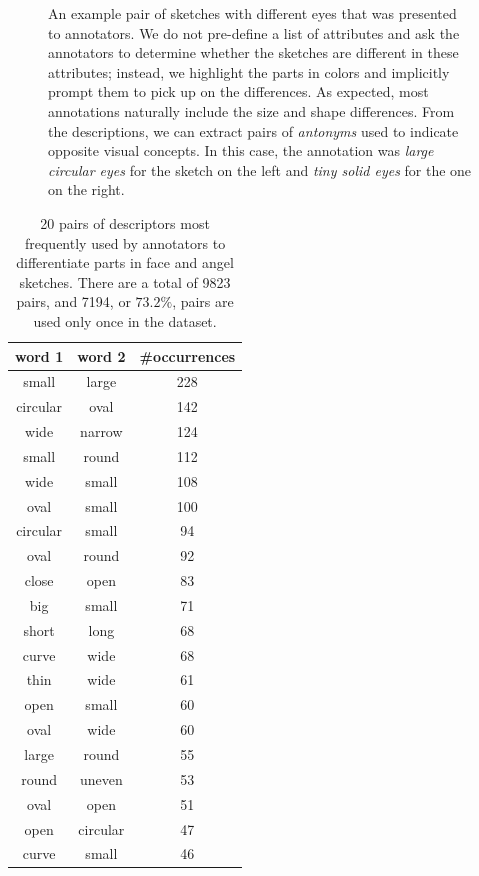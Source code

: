 \begin{figure}[!h]
\begin{subfigure}{0.5\textwidth}
\end{subfigure}
\caption{An example pair of sketches with different eyes that was presented to annotators. We do not pre-define a list of attributes and ask the annotators to determine whether the sketches are different in these attributes; instead, we highlight the parts in colors and implicitly prompt them to pick up on the differences. As expected, most annotations naturally include the size and shape differences. From the descriptions, we can extract pairs of \textit{antonyms} used to indicate opposite visual concepts. In this case, the annotation was \textit{large circular eyes} for the sketch on the left and \textit{tiny solid eyes} for the one on the right.}
\label{results.contrasting.sketches}
\end{figure}

\begin{table}[htb!]
\begin{minipage}{1\textwidth}
\begin{center}
{\small
\begin{tabular}{ccc}
\toprule
word 1 & word 2 & \#occurrences \\
\midrule 
small & large & 228 \\
circular & oval & 142 \\
wide & narrow & 124 \\
small & round & 112 \\
wide & small & 108 \\
oval & small & 100 \\
circular & small & 94 \\
oval & round & 92 \\
close & open & 83 \\
big & small & 71 \\
short & long & 68 \\
curve & wide & 68 \\
thin & wide & 61 \\
open & small & 60 \\
oval & wide & 60 \\
large & round & 55 \\
round & uneven & 53 \\
oval & open & 51 \\
open & circular & 47 \\
curve & small & 46 \\
\bottomrule
\end{tabular}}
\caption{20 pairs of descriptors most frequently used by annotators to differentiate parts in face and angel sketches. There are a total of 9823 pairs, and 7194, or $73.2\%$, pairs are used only once in the dataset.}
\label{results.clip.top20.sim}
\end{center}
\end{minipage} 
\end{table}

